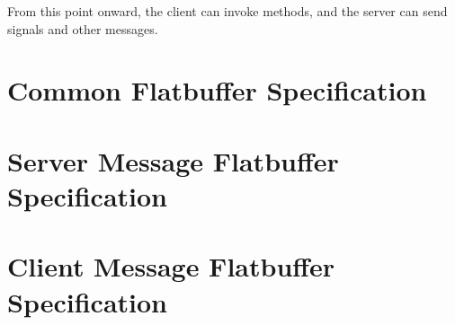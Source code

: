 \documentclass[11pt, oneside]{amsart}
\begin{document}
From this point onward, the client can invoke methods, and the server can send signals and other messages.

\appendix

\section{Common Flatbuffer Specification}



\section{Server Message Flatbuffer Specification}


\section{Client Message Flatbuffer Specification}

\end{document}
